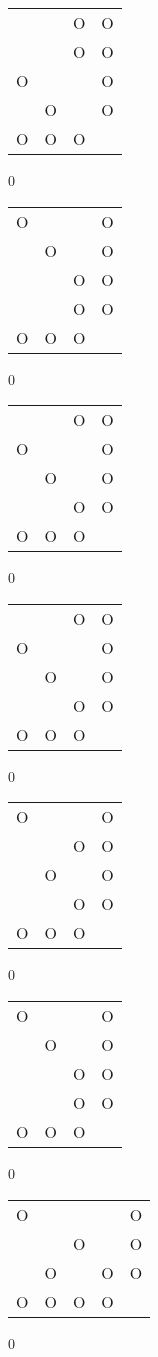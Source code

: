 \begin{tabular}{|m{0.2cm}m{0.2cm}m{0.2cm}m{0.2cm}|}\hline
 & &O&O\\
 & &O&O\\
O& & &O\\
 &O& &O\\
O&O&O& \\
\hline\end{tabular}0
\begin{tabular}{|m{0.2cm}m{0.2cm}m{0.2cm}m{0.2cm}|}\hline
O& & &O\\
 &O& &O\\
 & &O&O\\
 & &O&O\\
O&O&O& \\
\hline\end{tabular}0
\begin{tabular}{|m{0.2cm}m{0.2cm}m{0.2cm}m{0.2cm}|}\hline
 & &O&O\\
O& & &O\\
 &O& &O\\
 & &O&O\\
O&O&O& \\
\hline\end{tabular}0
\begin{tabular}{|m{0.2cm}m{0.2cm}m{0.2cm}m{0.2cm}|}\hline
 & &O&O\\
O& & &O\\
 &O& &O\\
 & &O&O\\
O&O&O& \\
\hline\end{tabular}0
\begin{tabular}{|m{0.2cm}m{0.2cm}m{0.2cm}m{0.2cm}|}\hline
O& & &O\\
 & &O&O\\
 &O& &O\\
 & &O&O\\
O&O&O& \\
\hline\end{tabular}0
\begin{tabular}{|m{0.2cm}m{0.2cm}m{0.2cm}m{0.2cm}|}\hline
O& & &O\\
 &O& &O\\
 & &O&O\\
 & &O&O\\
O&O&O& \\
\hline\end{tabular}0
\begin{tabular}{|m{0.2cm}m{0.2cm}m{0.2cm}m{0.2cm}m{0.2cm}|}\hline
O& & & &O\\
 & &O& &O\\
 &O& &O&O\\
O&O&O&O& \\
\hline\end{tabular}0

